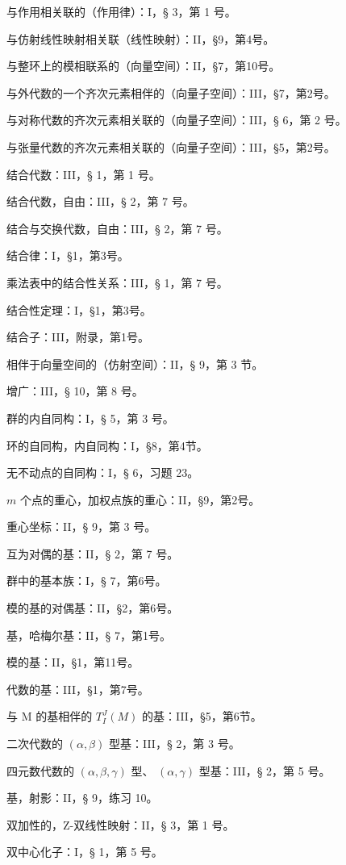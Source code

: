 与作用相关联的（作用律）：I，§ 3，第 1 号。

与仿射线性映射相关联（线性映射）：II，§9，第4号。

与整环上的模相联系的（向量空间）：II，§7，第10号。

与外代数的一个齐次元素相伴的（向量子空间）：III，§7，第2号。

与对称代数的齐次元素相关联的（向量子空间）：III，§ 6，第 2 号。

与张量代数的齐次元素相关联的（向量子空间）：III，§5，第2号。

结合代数：III，§ 1，第 1 号。

结合代数，自由：III，§ 2，第 7 号。

结合与交换代数，自由：III，§ 2，第 7 号。

结合律：I，§1，第3号。

乘法表中的结合性关系：III，§ 1，第 7 号。

结合性定理：I，§1，第3号。

结合子：III，附录，第1号。

相伴于向量空间的（仿射空间）：II，§ 9，第 3 节。

增广：III，§ 10，第 8 号。

群的内自同构：I，§ 5，第 3 号。

环的自同构，内自同构：I，§8，第4节。

无不动点的自同构：I，§ 6，习题 23。

\(m\) 个点的重心，加权点族的重心：II，§9，第2号。

重心坐标：II，§ 9，第 3 号。

互为对偶的基：II，§ 2，第 7 号。

群中的基本族：I，§ 7，第6号。

模的基的对偶基：II，§2，第6号。

基，哈梅尔基：II，§ 7，第1号。

模的基：II，§1，第11号。

代数的基：III，§1，第7号。

与 M 的基相伴的 \(T_{I}^{J}(M)\) 的基：III，§5，第6节。

二次代数的 \((\alpha, \beta)\) 型基：III，§ 2，第 3 号。

四元数代数的 \((\alpha, \beta, \gamma)\) 型、 \((\alpha, \gamma)\) 型基：III，§ 2，第 5 号。

基，射影：II，§ 9，练习 10。

双加性的，Z-双线性映射：II，§ 3，第 1 号。

双中心化子：I，§ 1，第 5 号。

